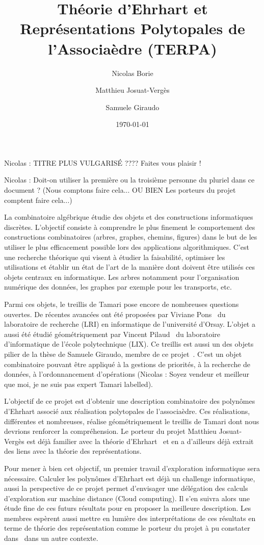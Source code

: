 \documentclass[a4paper, 10pt]{article}
\title{Théorie d'Ehrhart et Représentations Polytopales de l'Associaèdre (TERPA)}
\date{\today}
\author{Nicolas Borie \and Matthieu Josuat-Verg\`es \and Samuele Giraudo}
\numberwithin{equation}{subsection}
\begin{document}
\maketitle

Nicolas : TITRE PLUS VULGARISÉ ???? Faites vous plaisir !

Nicolas : Doit-on utiliser la première ou la troisième personne du pluriel dans ce document ?
(Nous comptons faire cela... OU BIEN Les porteurs du projet comptent faire cela...)


La combinatoire algébrique étudie des objets et des constructions
informatiques discrètes. L'objectif consiste à comprendre le plus
finement le comportement des constructions combinatoires (arbres,
graphes, chemins, figures) dans le but de les utiliser le plus
efficacement possible lors des applications algorithmiques. C'est une
recherche théorique qui visent à étudier la faisabilité, optimiser les
utilisations et établir un état de l'art de la manière dont doivent
être utilisés ces objets centraux en informatique. Les arbres
notamment pour l'organisation numérique des données, les graphes par
exemple pour les transports, etc.



Parmi ces objets, le treillis de Tamari pose encore de nombreuses
questions ouvertes. De récentes avancées ont été proposées par Viviane
Pons~\cite{MR3345297} du laboratoire de recherche (LRI) en
informatique de l'université d'Orsay. L'objet a aussi été étudié
géométriquement par Vincent Pilaud~\cite{MR3327085} du laboratoire
d'informatique de l'école polytechnique (LIX). Ce treillis est aussi
un des objets pilier de la thèse de Samuele Giraudo, membre de ce
projet~\cite{MR2887627}. C'est un objet combinatoire pouvant être
appliqué à la gestions de priorités, à la recherche de données, à
l'ordonnancement d'opérations (Nicolas : Soyez vendeur et meilleur que
moi, je ne suis pas expert Tamari labelled).



L'objectif de ce projet est d'obtenir une description combinatoire des
polynômes d'Ehrhart associé aux réalisation polytopales de
l'associaèdre. Ces réalisations, différentes et nombreuses, réalise
géométriquement le treillis de Tamari dont nous devrions renforcer la
compréhension. Le porteur du projet Matthieu Josuat-Vergès est déjà
familier avec la théorie d'Ehrhart~\cite{MR3484760} et en a d'ailleurs
déjà extrait des liens avec la théorie des représentations.



Pour mener à bien cet objectif, un premier travail d'exploration
informatique sera nécessaire. Calculer les polynômes d'Ehrhart est
déjà un challenge informatique, aussi la perspective de ce projet
permet d'envisager une délégation des calculs d'exploration sur
machine distance (Cloud computing). Il s'en suivra alors une étude
fine de ces futurs résultats pour en proposer la meilleure
description. Les membres espèrent aussi mettre en lumière des
interprétations de ces résultats en terme de théorie des
représentation comme le porteur du projet à pu constater
dans~\cite{MR3484760} dans un autre contexte.
\end{document}
